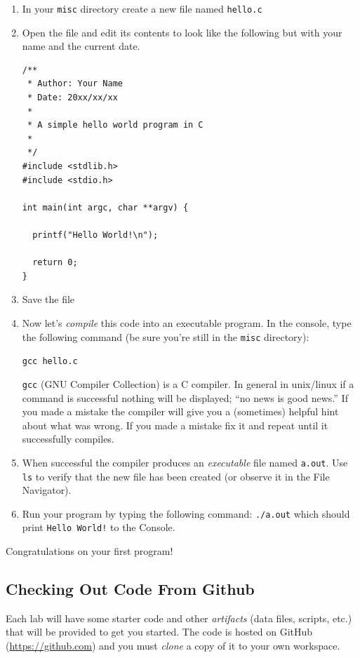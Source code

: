 \documentclass[12pt]{scrartcl}
\begin{document}
\begin{enumerate}
  \item In your \texttt{misc} directory create a new file
  named \texttt{hello.c}
  \item Open the file and edit its contents to look like the 
  following but with your name and the current date.
  
\begin{verbatim}
/**
 * Author: Your Name
 * Date: 20xx/xx/xx
 *
 * A simple hello world program in C
 *
 */
#include <stdlib.h>
#include <stdio.h>

int main(int argc, char **argv) {

  printf("Hello World!\n");

  return 0;
}
\end{verbatim}

  \item Save the file
  \item Now let's \emph{compile} this code into an executable program.
  In the console, type the following command (be sure you're still in the 
  \texttt{misc} directory): %

  \texttt{gcc hello.c}
  
  \texttt{gcc} (GNU Compiler Collection) is a C compiler.  
  In general in unix/linux if a command is successful nothing will 
  be displayed; ``no news is good news.''  If you made a mistake the
  compiler will give you a (sometimes) helpful hint about what was wrong.
  If you made a mistake fix it and repeat until it successfully compiles.
  \item When successful the compiler produces an \emph{executable} file 
  named \texttt{a.out}.  Use \texttt{ls} to verify 
  that the new file has been created (or observe it in the File Navigator).  
  \item Run your program by typing the following command: 
  \texttt{./a.out} which should print \texttt{Hello World!}
  to the Console.  
\end{enumerate}

Congratulations on your first program!

\subsection{Checking Out Code From Github}

Each lab will have some starter code and other \emph{artifacts} (data files, 
scripts, etc.) that will be provided to get you started.  The code is hosted
on GitHub (\url{https://github.com}) and you must \emph{clone} a copy of
it to your own workspace.
\end{document}
